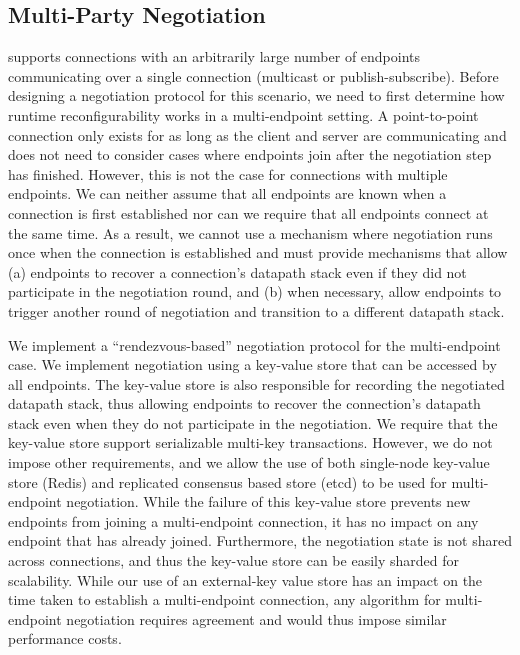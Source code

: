 \subsection{Multi-Party Negotiation}\label{s:multilateral}
\name supports connections with an arbitrarily large number of endpoints communicating over a single connection (\eg multicast or publish-subscribe). Before designing a negotiation protocol for this scenario, we need to first determine how runtime reconfigurability works in a multi-endpoint setting. A point-to-point connection only exists for as long as the client and server are communicating and does not need to consider cases where endpoints join after the negotiation step has finished. However, this is not the case for connections with multiple endpoints. We can neither assume that all endpoints are known when a connection is first established nor can we require that all endpoints connect at the same time. As a result, we cannot use a mechanism where negotiation runs once when the connection is established and must provide mechanisms that allow (a) endpoints to recover a connection's datapath stack even if they did not participate in the negotiation round, and (b) when necessary, allow endpoints to trigger another round of negotiation and transition to a different datapath stack. 

We implement a ``rendezvous-based'' negotiation protocol for the multi-endpoint case. We implement negotiation using a key-value store that can be accessed by all endpoints. The key-value store is also responsible for recording the negotiated datapath stack, thus allowing endpoints to recover the connection's datapath stack even when they do not participate in the negotiation. We require that the key-value store support serializable multi-key transactions. However, we do not impose other requirements, and we allow the use of both single-node key-value store (\eg Redis) and replicated consensus based store (\eg etcd) to be used for multi-endpoint negotiation. While the failure of this key-value store prevents new endpoints from joining a multi-endpoint connection, it has no impact on any endpoint that has already joined. Furthermore, the negotiation state is not shared across connections, and thus the key-value store can be easily sharded for scalability. While our use of an external-key value store has an impact on the time taken to establish a multi-endpoint connection, any algorithm for multi-endpoint negotiation requires agreement and would thus impose similar performance costs.

